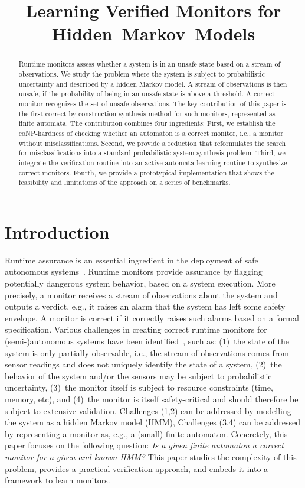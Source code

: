 \documentclass[runningheads]{llncs}
\title{Learning Verified Monitors for Hidden~Markov~Models}
\author{}
\institute{}
\newcommand{\sj}[2][]{\todo[color=red!50!white,#1]{\footnotesize{SJ: #2}}}
\begin{document}
\maketitle
\begin{abstract}
    Runtime monitors assess whether a system is in an unsafe state based on a stream of observations. We study the problem where the system is subject to probabilistic uncertainty and described by a hidden Markov model. A stream of observations is then unsafe, if the probability of being in an unsafe state is above a threshold. A correct monitor recognizes the set of unsafe observations. The key contribution of this paper is the first correct-by-construction synthesis method for such monitors, represented as finite automata. The contribution combines four ingredients: First, we establish the coNP-hardness of checking whether an automaton is a correct monitor, i.e., a monitor without misclassifications. Second, we provide a reduction that reformulates the search for misclassifications into a standard probabilistic system synthesis problem. Third, we integrate the verification routine into an active automata learning routine to synthesize correct monitors. Fourth, we provide a prototypical implementation that shows the feasibility and limitations of the approach on a series of benchmarks.
\end{abstract}

\section{Introduction}
\sj{Fix citations with xx}
\noindent
Runtime assurance is an essential ingredient in the deployment of safe autonomous systems~\cite{bartocciLecturesRuntimeVerification2018,sanchezSurveyChallengesRuntime2019}.
Runtime monitors provide assurance by flagging potentially dangerous system behavior, based on a system execution.
More precisely, a monitor receives a stream of observations about the system and outputs a verdict, e.g., it raises an alarm that the system has left some safety envelope. A monitor is correct if it correctly raises such alarms based on a formal specification.
Various challenges in creating correct runtime monitors for (semi-)autonomous systems have been identified~\cite{sanchezSurveyChallengesRuntime2019}, such as:
(1)~the state of the system is only partially observable, i.e., the stream of observations comes from sensor readings and does not uniquely identify the state of a system,
(2)~the behavior of the system and/or the sensors may be subject to probabilistic uncertainty,
(3)~the monitor itself is subject to resource constraints (time, memory, etc), and
(4)~the monitor is itself safety-critical and should therefore be subject to extensive validation.
Challenges (1,2) can be addressed  by modelling the system as a hidden Markov model (HMM), Challenges (3,4) can be addressed by representing a monitor as, e.g., a (small) finite automaton.
Concretely, this paper focuses on the following question:
\emph{Is a given finite automaton a correct monitor for a given and known HMM?}
This paper studies the complexity of this problem, provides a practical verification approach, and embeds it into a framework to learn monitors.
\end{document}
